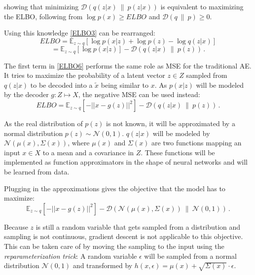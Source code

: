 \documentclass[a4paper]{IEEEtran}
\begin{document}
showing that minimizing $\mathcal{D}\left(q(z|x) \ \| \ p(z|x) \right)$ is equivalent to maximizing the ELBO, following from $\log p(x) \geq ELBO$ and $\mathcal{D}(q \ \| \ p) \geq 0$.

Using this knowledge \eqref{ELBO3} can be rearranged:
\begin{equation}
	ELBO = \mathbb{E}_{z \sim q}\left[ \log p(x|z) + \log p(z) - \log q(z|x) \right]
	\label{ELBO5}
\end{equation}
\begin{equation}
	= \mathbb{E}_{z \sim q}\left[ \log p(x|z) \right] - \mathcal{D}(q(z|x) \ \| \ p(z))\,.
	\label{ELBO6}
\end{equation}

The first term in \eqref{ELBO6} performs the same role as MSE for the traditional AE. It tries to maximize the probability of a latent vector $z \in Z$ sampled from $q(z|x)$ to be decoded into a $\tilde{x}$ being similar to $x$. As $p(x|z)$ will be modeled by the decoder $g : Z \mapsto X$, the negative MSE can be used instead:
\begin{equation}
	ELBO = \mathbb{E}_{z \sim q}\left[ -||x - g(z)||^2 \right] - \mathcal{D}(q(z|x) \ \| \ p(z))\,.
	\label{ELBO7}
\end{equation}

As the real distribution of $p(z)$ is not known, it will be approximated by a normal distribution $p(z) \sim \mathcal{N}(0,1)$. $q(z|x)$ will be modeled by $\mathcal{N}(\mu(x), \Sigma(x))$, where $\mu(x)$ and $\Sigma(x)$ are two functions mapping an input $x \in X$ to a mean and a covariance in $Z$. These functions will be implemented as function approximators in the shape of neural networks and will be learned from data.

Plugging in the approximations gives the objective that the model has to maximize:
\begin{equation}
	\mathbb{E}_{z \sim q}\left[ -||x - g(z)||^2 \right] - \mathcal{D}(\mathcal{N}(\mu(x), \Sigma(x)) \ \| \ \mathcal{N}(0, 1))\,.
	\label{ELBO8}
\end{equation}

Because $z$ is still a random variable that gets sampled from a distribution and sampling is not continuous, gradient descent is not applicable to this objective. This can be taken care of by moving the sampling to the input using the \textit{reparameterization trick}: A random variable $\epsilon$ will be sampled from a normal distribution $\mathcal{N}(0,1)$ and transformed by $h(x, \epsilon) = \mu(x) + \sqrt{\Sigma(x)} \cdot \epsilon$. 
\end{document}

